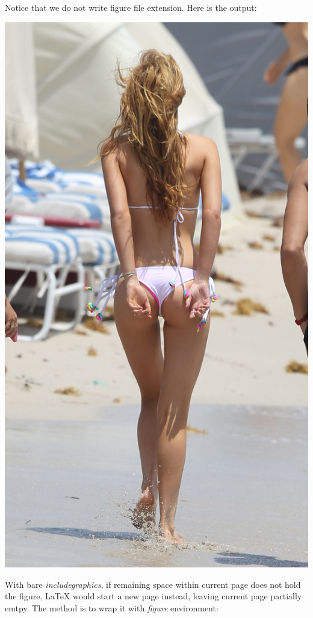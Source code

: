 Notice that we do not write figure file extension. Here is the
output:
\begin{center}
  \includegraphics[scale=0.1]{leg}
\end{center}

With bare \textit{includegraphics}, if remaining space within current
page does not hold the figure, \LaTeX{} would start a new page
instead, leaving current page partially emtpy. The method is to
wrap it with \textit{figure} environment:

